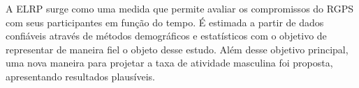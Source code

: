 \documentclass[12pt, 						%
			openright, 					%
			twoside,					%
			a4paper,x					%
			english,					%
			brazil]{abntex2}				%
\begin{document}
    A ELRP surge como uma medida que permite avaliar os compromissos do RGPS com seus participantes em função do tempo. É estimada a partir de dados confiáveis através de métodos demográficos e estatísticos com o objetivo de representar de maneira fiel o objeto desse estudo. Além desse objetivo principal, uma nova maneira para projetar a taxa de atividade masculina foi proposta, apresentando resultados plausíveis.


\end{document}
